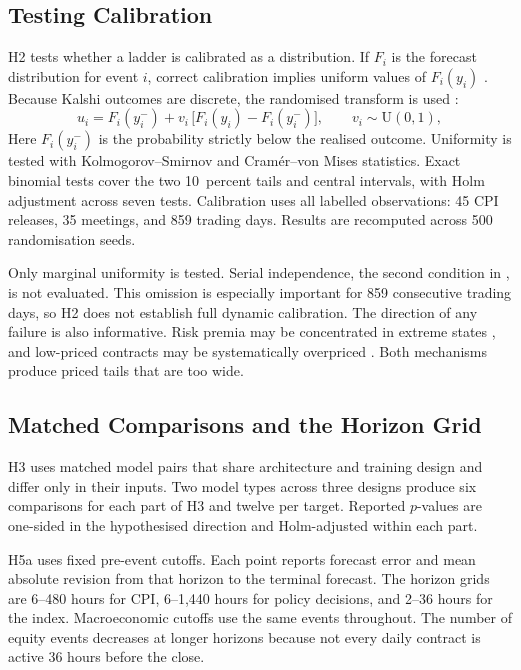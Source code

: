\documentclass[12pt,a4paper]{report}
\begin{document}
\subsection{Testing Calibration}
\label{sec:results-design-pit}

H2 tests whether a ladder is calibrated as a distribution. If $F_i$ is the
forecast distribution for event $i$, correct calibration implies uniform
values of $F_i(y_i)$ \parencite{diebold1998}. Because Kalshi outcomes are
discrete, the randomised transform is used \parencite{czado2009, rossi2019}:
\begin{equation}
u_i = F_i(y_i^-) + v_i\,\bigl[F_i(y_i) - F_i(y_i^-)\bigr],
\qquad v_i \sim \mathrm{U}(0,1),
\label{eq:pit}
\end{equation}
Here $F_i(y_i^-)$ is the probability strictly below the realised outcome.
Uniformity is tested with Kolmogorov--Smirnov \parencite{massey1951} and
Cramér--von Mises \parencite{anderson1952} statistics. Exact binomial tests
cover the two 10~percent tails and central intervals, with Holm adjustment
across seven tests. Calibration uses all labelled observations: 45 CPI
releases, 35 meetings, and 859 trading days. Results are recomputed across 500
randomisation seeds.

Only marginal uniformity is tested. Serial independence, the second condition
in \textcite{diebold1998}, is not evaluated. This omission is especially
important for 859 consecutive trading days, so H2 does not establish full
dynamic calibration. The direction of any failure is also informative. Risk
premia may be concentrated in extreme states \parencite{kitsul2013}, and
low-priced contracts may be systematically overpriced
\parencite{burgi2025}. Both mechanisms produce priced tails that are too wide.

\subsection{Matched Comparisons and the Horizon Grid}
\label{sec:results-design-h3}

H3 uses matched model pairs that share architecture and training design and
differ only in their inputs. Two model types across three designs produce six
comparisons for each part of H3 and twelve per target. Reported $p$-values are
one-sided in the hypothesised direction and Holm-adjusted within each part.

H5a uses fixed pre-event cutoffs. Each point reports forecast error and mean
absolute revision from that horizon to the terminal forecast. The horizon
grids are 6--480 hours for CPI, 6--1{,}440 hours for policy decisions, and 2--36
hours for the index. Macroeconomic cutoffs use the same events throughout. The
number of equity events decreases at longer horizons because not every daily
contract is active 36 hours before the close.
\end{document}
